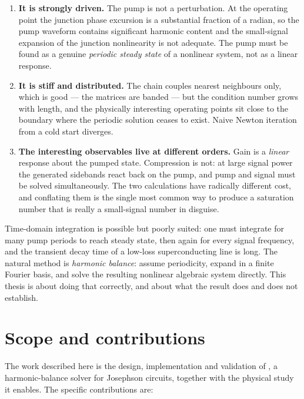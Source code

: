 \begin{enumerate}
\item \textbf{It is strongly driven.} The pump is not a perturbation. At the
      operating point the junction phase excursion is a substantial fraction of
      a radian, so the pump waveform contains significant harmonic content and
      the small-signal expansion of the junction nonlinearity is not adequate.
      The pump must be found as a genuine \emph{periodic steady state} of a
      nonlinear system, not as a linear response.

\item \textbf{It is stiff and distributed.} The chain couples nearest
      neighbours only, which is good --- the matrices are banded --- but the
      condition number grows with length, and the physically interesting
      operating points sit close to the boundary where the periodic solution
      ceases to exist. Naive Newton iteration from a cold start diverges.

\item \textbf{The interesting observables live at different orders.} Gain is a
      \emph{linear} response about the pumped state. Compression is not: at
      large signal power the generated sidebands react back on the pump, and
      pump and signal must be solved simultaneously. The two calculations have
      radically different cost, and conflating them is the single most common
      way to produce a saturation number that is really a small-signal number
      in disguise.
\end{enumerate}

Time-domain integration is possible but poorly suited: one must integrate for
many pump periods to reach steady state, then again for every signal frequency,
and the transient decay time of a low-loss superconducting line is long. The
natural method is \emph{harmonic balance}: assume periodicity, expand in a
finite Fourier basis, and solve the resulting nonlinear algebraic system
directly. This thesis is about doing that correctly, and about what the result
does and does not establish.

\section{Scope and contributions}

The work described here is the design, implementation and validation of
, a harmonic-balance solver for Josephson circuits, together
with the physical study it enables. The specific contributions are:

